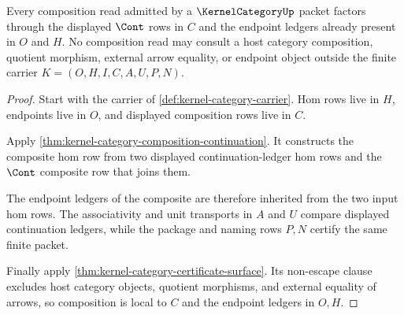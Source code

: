 \begin{theorem}
\label{thm:kernel-category-cont-composition-locality}
Every composition read admitted by a $\KernelCategoryUp$ packet factors through the displayed $\Cont$ rows in $C$ and the endpoint ledgers already present in $O$ and $H$. No composition read may consult a host category composition, quotient morphism, external arrow equality, or endpoint object outside the finite carrier $K=(O,H,I,C,A,U,P,N)$.
\end{theorem}
\begin{proof}
Start with the carrier of \autoref{def:kernel-category-carrier}. Hom rows live in $H$, endpoints live in $O$, and displayed composition rows live in $C$.

Apply \autoref{thm:kernel-category-composition-continuation}. It constructs the composite hom row from two displayed continuation-ledger hom rows and the $\Cont$ composite row that joins them.

The endpoint ledgers of the composite are therefore inherited from the two input hom rows. The associativity and unit transports in $A$ and $U$ compare displayed continuation ledgers, while the package and naming rows $P,N$ certify the same finite packet.

Finally apply \autoref{thm:kernel-category-certificate-surface}. Its non-escape clause excludes host category objects, quotient morphisms, and external equality of arrows, so composition is local to $C$ and the endpoint ledgers in $O,H$.
\end{proof}

